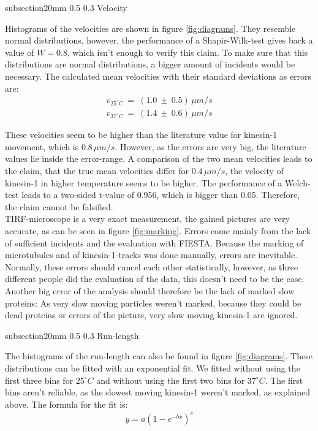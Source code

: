 \documentclass[english, %
parskip=full, %
bibliography=totoc, %
]{scrartcl}
\makeatletter
\renewcommand\subsection{\@startsection 
   {subsection}{2}{0mm}%
   {0.5\baselineskip}%
   {0.3\baselineskip}%
   {\bfseries\sffamily\large}%
   }
\makeatother
\begin{document}
\subsection{Velocity}

Histograms of the velocities are shown in figure \ref{fig:diagrams}. They resemble normal distributions, however, the performance of a Shapir-Wilk-test gives back a value of $W = 0.8$, which isn't enough to verify this claim. To make sure that this distributions are normal distributions, a bigger amount of incidents would be necessary. The calculated mean velocities with their standard deviations as errors are:
\begin{align*}
v _{25^\circ C} \ = \ (1.0 \ \pm \ 0.5) \, \mu m/s \\
v _{37^\circ C} \ = \ (1.4 \ \pm \ 0.6) \, \mu m/s
\end{align*}

These velocities seem to be higher than the literature value for kinesin-1 movement, which is 0.8\,$\mu m/s$. However, as the errors are very big, the literature values lie inside the error-range. A comparison of the two mean velocities leads to the claim, that the true mean velocities differ for $0.4\, \mu m/s$, the velocity of kinesin-1 in higher temperature seems to be higher. The performance of a Welch-test leads to a two-sided t-value of 0.956, which is bigger than 0.05. Therefore, the claim cannot be falsified. \\
TIRF-microscope is a very exact measurement, the gained pictures are very accurate, as can be seen in figure \ref{fig:marking}. Errors come mainly from the lack of sufficient incidents and the evaluation with FIESTA. Because the marking of microtubules and of kinesin-1-tracks was done manually, errors are inevitable. Normally, these errors should cancel each other statistically, however, as three different people did the evaluation of the data, this doesn't need to be the case. Another big error of the analysis should therefore be the lack of marked slow proteins: As very slow moving particles weren't marked, because they could be dead proteins or errors of the picture, very slow moving kinesin-1 are ignored.

\subsection{Run-length}

The histograms of the run-length can also be found in figure \ref{fig:diagrams}. These distributions can be fitted with an exponential fit. We fitted without using the first three bins for $25^\circ C$ and without using the first two bins for $37^\circ C$. The first bins aren't reliable, as the slowest moving kinesin-1 weren't marked, as explained above. The formula for the fit is:
\begin{align*}
y = a (1 - e^{-bx})^c
\end{align*}
\end{document}
